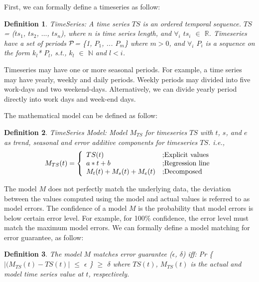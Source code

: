\documentclass[10pt,conference,letterpaper]{IEEEtran}
\newtheorem{mydef}{Definition}
\begin{document}
First, we can formally define a timeseries as follow:
\begin{mydef} TimeSeries: A time series $TS$ is an ordered temporal sequence. $TS$= ($ts_1$, $ts_2$, $\dots$, $ts_n$), where $n$ is time series length, and $\forall_i$ $ts_i$ $\in$ $\mathbb{R}$. Timeseries have a set of periods $\cal P$= \{1, $P_1$, ... $P_m$\} where $m > 0$, and $\forall_i$ $P_i$ is a sequence on the form $k_l$* $P_l$, s.t., $k_l$ $\in$ $\mathbb{N}$ and $l<i$.
\end{mydef}

Timeseries may have one or more seasonal periods. For example, a time series may have  yearly, weekly and daily periods. Weekly periods may divided into five work-days and two weekend-days. Alternatively, we can  divide yearly period directly into work days and week-end days.
 
The mathematical model can be defined as follow:
\begin{mydef} TimeSeries Model: Model $M_{TS}$ for timeseries $TS$ with  $t$, $s$, and $e$ as trend, seasonal and error additive components for timeseries $TS$. i.e.,   
\[
  M_{TS}(t) = \left\{ 
  \begin{array}{l l}
    TS (t) &  \text{;Explicit values}
    \\
    a*t+b             & \text{;Regression line} \\
    M_{t}(t)+M_{s}(t)+M_{e}(t) &  \text{;Decomposed}\\
  \end{array} \right.
\]
\end{mydef}

The model $M$ does not perfectly match the underlying data, the deviation between the values computed using the model  and actual values is referred to as model errors. The confidence of a model $M$ is the probability that model errors is below certain error level. For example, for 100\% confidence, the error level must match the maximum model errors. We can formally define a  model matching for  error guarantee, as follow:
\begin{mydef} The model $M$ matches error guarantee ($\epsilon$, $\delta$) iff: 
Pr \{ $|(M_{TS}(t) - TS(t)|$ $\leq$ $\epsilon$ \} $\geq$ $\delta$ where $TS(t)$, $M_{TS}(t)$ is the actual and model time series value at $t$, respectively.
\end{mydef}
\end{document}
